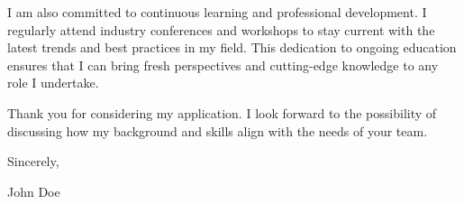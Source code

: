 \documentclass[
    language=english,
    doctype=cover-letter,
    institution=none,
    titlestyle=simple
]{../../omnilatex}
\begin{document}
I am also committed to continuous learning and professional development. I regularly attend industry conferences and workshops to stay current with the latest trends and best practices in my field. This dedication to ongoing education ensures that I can bring fresh perspectives and cutting-edge knowledge to any role I undertake.

Thank you for considering my application. I look forward to the possibility of discussing how my background and skills align with the needs of your team.

Sincerely,

\vspace{2cm}

John Doe
\end{document}
